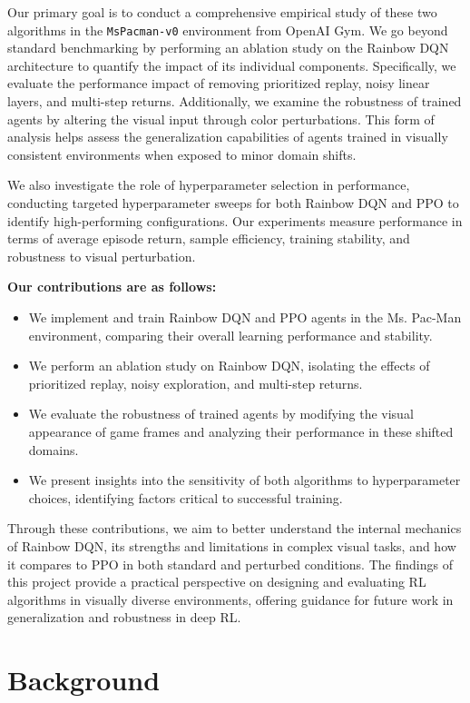 \documentclass{article}
\begin{document}
Our primary goal is to conduct a comprehensive empirical study of these two algorithms in the \texttt{MsPacman-v0} environment from OpenAI Gym. We go beyond standard benchmarking by performing an ablation study on the Rainbow DQN architecture to quantify the impact of its individual components. Specifically, we evaluate the performance impact of removing prioritized replay, noisy linear layers, and multi-step returns. Additionally, we examine the robustness of trained agents by altering the visual input through color perturbations. This form of analysis helps assess the generalization capabilities of agents trained in visually consistent environments when exposed to minor domain shifts.

We also investigate the role of hyperparameter selection in performance, conducting targeted hyperparameter sweeps for both Rainbow DQN and PPO to identify high-performing configurations. Our experiments measure performance in terms of average episode return, sample efficiency, training stability, and robustness to visual perturbation.

\textbf{Our contributions are as follows:}
\begin{itemize}
    \item We implement and train Rainbow DQN and PPO agents in the Ms. Pac-Man environment, comparing their overall learning performance and stability.
    \item We perform an ablation study on Rainbow DQN, isolating the effects of prioritized replay, noisy exploration, and multi-step returns.
    \item We evaluate the robustness of trained agents by modifying the visual appearance of game frames and analyzing their performance in these shifted domains.
    \item We present insights into the sensitivity of both algorithms to hyperparameter choices, identifying factors critical to successful training.
\end{itemize}

Through these contributions, we aim to better understand the internal mechanics of Rainbow DQN, its strengths and limitations in complex visual tasks, and how it compares to PPO in both standard and perturbed conditions. The findings of this project provide a practical perspective on designing and evaluating RL algorithms in visually diverse environments, offering guidance for future work in generalization and robustness in deep RL.

\section{Background}
\end{document}

